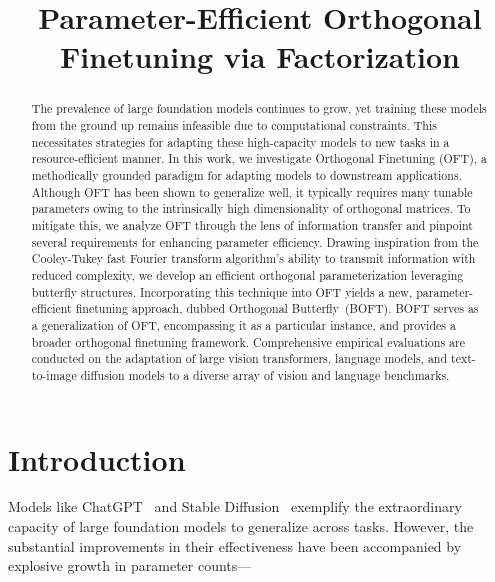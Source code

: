 \title{Parameter-Efficient Orthogonal Finetuning via Factorization}

\begin{abstract}
The prevalence of large foundation models continues to grow, yet training these models from the ground up remains infeasible due to computational constraints. This necessitates strategies for adapting these high-capacity models to new tasks in a resource-efficient manner. In this work, we investigate Orthogonal Finetuning (OFT), a methodically grounded paradigm for adapting models to downstream applications. Although OFT has been shown to generalize well, it typically requires many tunable parameters owing to the intrinsically high dimensionality of orthogonal matrices. To mitigate this, we analyze OFT through the lens of information transfer and pinpoint several requirements for enhancing parameter efficiency. Drawing inspiration from the Cooley-Tukey fast Fourier transform algorithm's ability to transmit information with reduced complexity, we develop an efficient orthogonal parameterization leveraging butterfly structures. Incorporating this technique into OFT yields a new, parameter-efficient finetuning approach, dubbed Orthogonal Butterfly~(BOFT). BOFT serves as a generalization of OFT, encompassing it as a particular instance, and provides a broader orthogonal finetuning framework. Comprehensive empirical evaluations are conducted on the adaptation of large vision transformers, language models, and text-to-image diffusion models to a diverse array of vision and language benchmarks.
\end{abstract}

\section{Introduction}

Models like ChatGPT~\cite{brown2020language,chen2021evaluating} and Stable Diffusion~\cite{rombach2022high} exemplify the extraordinary capacity of large foundation models to generalize across tasks. However, the substantial improvements in their effectiveness have been accompanied by explosive growth in parameter counts—


